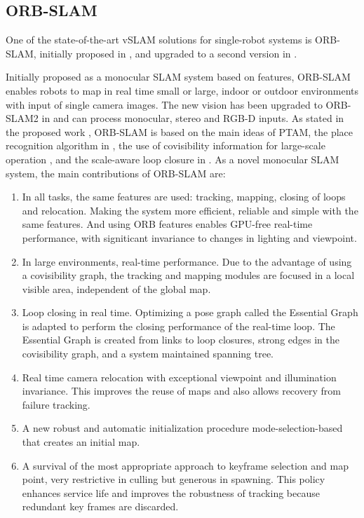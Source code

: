 

\subsection{ORB-SLAM}
\label{chp:orbslam}
One of the state-of-the-art vSLAM solutions for single-robot systems is ORB-SLAM, initially proposed in \cite{mur2015orb}, and upgraded to a second version in \cite{mur2017orb}.

Initially proposed as a monocular SLAM system based on features, ORB-SLAM enables robots to map in real time small or large, indoor or outdoor environments with input of single camera images. The new vision has been upgraded to ORB-SLAM2 in \cite{mur2017orb} and can process monocular, stereo and RGB-D inputs. As stated in the proposed work \cite{mur2015orb}, ORB-SLAM is based on the main ideas of PTAM, the place recognition algorithm in \cite{galvez2012bags}, the use of covisibility information for large-scale operation \cite{strasdat2011double}, \cite{mei2010closing} and the scale-aware loop closure in \cite{strasdat2010scale}.  As a novel monocular SLAM system, the main contributions of ORB-SLAM are:
\begin{enumerate}[1.]
	\item In all tasks, the same features are used: tracking, mapping, closing of loops and relocation. Making the system more efficient, reliable and simple with the same features. And using ORB features enables GPU-free real-time performance, with signiticant invariance to changes in lighting and viewpoint. 
	\item In large environments, real-time performance. Due to the advantage of using a covisibility graph, the tracking and mapping modules are focused in a local visible area, independent of the global map. 
	\item Loop closing in real time. Optimizing a pose graph called the Essential Graph is adapted to perform the closing performance of the real-time loop. The Essential Graph is created from links to loop closures, strong edges in the covisibility graph, and a system maintained spanning tree. \item Real time camera relocation with exceptional viewpoint and illumination invariance. This improves the reuse of maps and also allows recovery from failure tracking. 
	\item A new robust and automatic initialization procedure 
	mode-selection-based that creates an initial map.
	\item A survival of the most appropriate approach to keyframe selection and map point, very restrictive in culling but generous in spawning. This policy enhances service life and improves the robustness of tracking because redundant key frames are discarded.
\end{enumerate}

